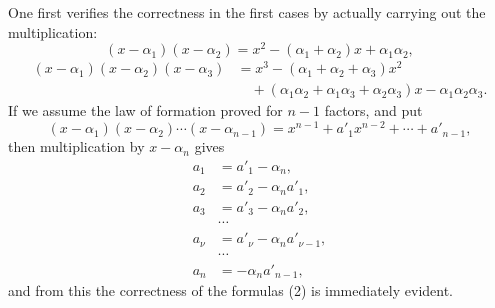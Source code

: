 \documentclass[11pt]{article}
\begin{document}
One first verifies the correctness in the first cases by actually carrying out the multiplication:
\[
 (x-\alpha_1)(x-\alpha_2)=x^2-(\alpha_1+\alpha_2)x+\alpha_1\alpha_2,
\]
\[
\begin{aligned}
 (x-\alpha_1)(x-\alpha_2)(x-\alpha_3)&=x^3-(\alpha_1+\alpha_2+\alpha_3)x^2\\
&\quad +(\alpha_1\alpha_2+\alpha_1\alpha_3+\alpha_2\alpha_3)x-\alpha_1\alpha_2\alpha_3.
\end{aligned}
\]
If we assume the law of formation proved for $n-1$ factors, and put
\[
 (x-\alpha_1)(x-\alpha_2)\cdots(x-\alpha_{n-1})=x^{n-1}+a'_1x^{n-2}+\cdots+a'_{n-1},
\]
then multiplication by $x-\alpha_n$ gives
\begin{equation}
\begin{aligned}
 a_1&=a'_1-\alpha_n,\\
 a_2&=a'_2-\alpha_n a'_1,\\
 a_3&=a'_3-\alpha_n a'_2,\\
&\cdots\\
 a_\nu&=a'_\nu-\alpha_n a'_{\nu-1},\\
&\cdots\\
 a_n&=-\alpha_n a'_{n-1},
\end{aligned}
\tag{3}
\end{equation}
and from this the correctness of the formulas (2) is immediately evident.
\end{document}
